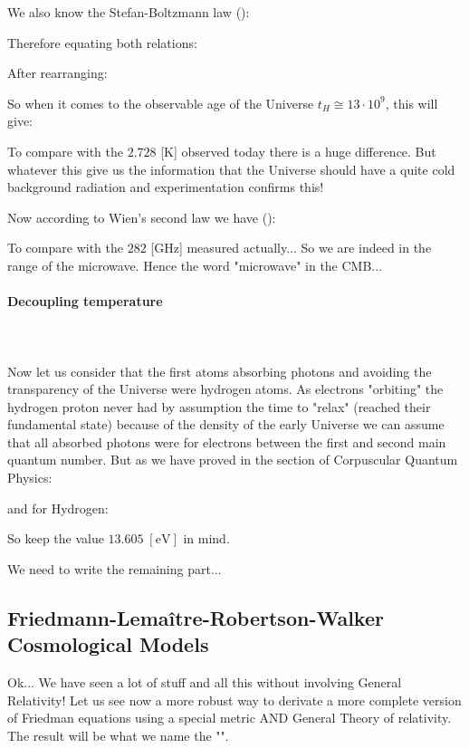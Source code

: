 	We also know the Stefan-Boltzmann law ():
	
	Therefore equating both relations:
	
	After rearranging:
	
	So when it comes to the observable age of the Universe $t_H\cong 13\cdot 10^9$, this will give:
	
	To compare with the $2.728$ [K] observed today there is a huge difference. But whatever this give us the information that the Universe should have a quite cold background radiation and experimentation confirms this!
	
	Now according to Wien's second law we have ():
	
	To compare with the $282$ [GHz] measured actually... So we are indeed in the range of the microwave. Hence the word "microwave" in the CMB...
	
	\paragraph{Decoupling temperature}\mbox{}\\\\
	Now let us consider that the first atoms absorbing photons and avoiding the transparency of the Universe were hydrogen atoms. As electrons "orbiting" the hydrogen proton never had by assumption the time to "relax" (reached their fundamental state) because of the density of the early Universe we can assume that all absorbed photons were for electrons between the first and second main quantum number. But as we have proved in the section of Corpuscular Quantum Physics:
	
	and for Hydrogen:
	
	So keep the value $13.605\;[\text{eV}]$ in mind.
	
	We need to write the remaining part...
	
	\pagebreak
	\subsection{Friedmann-Lemaître-Robertson-Walker Cosmological Models}
	Ok... We have seen a lot of stuff and all this without involving General Relativity! Let us see now a more robust way to derivate a more complete version of Friedman equations using a special metric AND General Theory of relativity. The result will be what we name the "".
	
